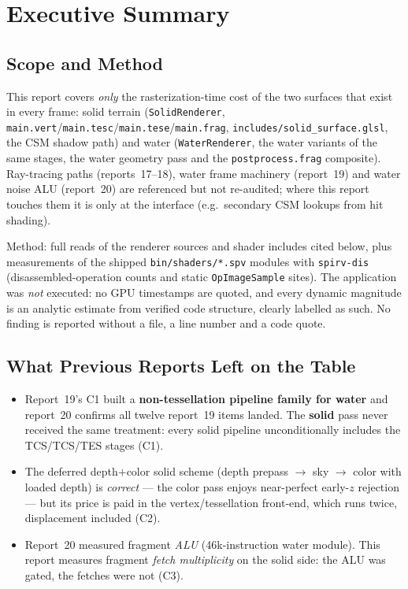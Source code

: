 \documentclass[11pt,a4paper]{article}
\begin{document}
\tableofcontents
\newpage

\section{Executive Summary}

\subsection{Scope and Method}

This report covers \emph{only} the rasterization-time cost of the two surfaces
that exist in every frame: solid terrain
(\texttt{SolidRenderer}, \texttt{main.vert}/\texttt{main.tesc}/\texttt{main.tese}/\texttt{main.frag},
\texttt{includes/solid\_surface.glsl}, the CSM shadow path) and water
(\texttt{WaterRenderer}, the water variants of the same stages, the water
geometry pass and the \texttt{postprocess.frag} composite). Ray-tracing paths
(reports~17--18), water frame machinery (report~19) and water noise ALU
(report~20) are referenced but not re-audited; where this report touches them
it is only at the interface (e.g.\ secondary CSM lookups from hit shading).

Method: full reads of the renderer sources and shader includes cited below,
plus measurements of the shipped \texttt{bin/shaders/*.spv} modules with
\texttt{spirv-dis} (disassembled-operation counts and static
\texttt{OpImageSample} sites). The application was \emph{not} executed: no GPU
timestamps are quoted, and every dynamic magnitude is an analytic estimate
from verified code structure, clearly labelled as such. No finding is reported
without a file, a line number and a code quote.

\subsection{What Previous Reports Left on the Table}

\begin{itemize}
    \item Report~19's C1 built a \textbf{non-tessellation pipeline family for
    water} and report~20 confirms all twelve report~19 items landed. The
    \textbf{solid} pass never received the same treatment: every solid
    pipeline unconditionally includes the TCS/TCS/TES stages (C1).
    \item The deferred depth$+$color solid scheme (depth prepass $\rightarrow$
    sky $\rightarrow$ color with loaded depth) is \emph{correct} --- the color
    pass enjoys near-perfect early-$z$ rejection --- but its price is paid in
    the vertex/tessellation front-end, which runs twice, displacement
    included (C2).
    \item Report~20 measured fragment \emph{ALU} (46k-instruction water
    module). This report measures fragment \emph{fetch multiplicity} on the
    solid side: the ALU was gated, the fetches were not (C3).
\end{itemize}
\end{document}
